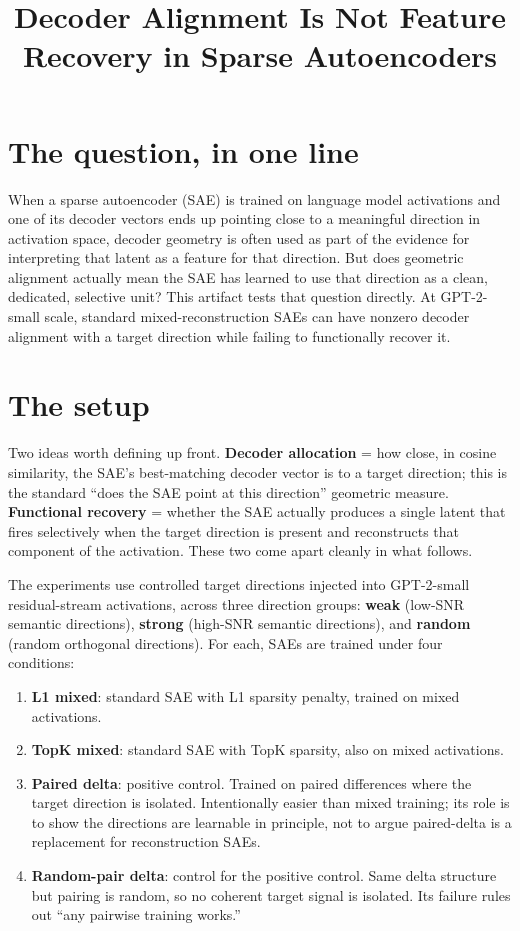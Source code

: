 \documentclass[10pt]{article}
\title{\vspace{-2.5em}\textbf{Decoder Alignment Is Not Feature Recovery in Sparse Autoencoders}\vspace{-0.5em}}
\author{}
\date{}
\begin{document}
\maketitle
\vspace{-3em}

\section*{The question, in one line}

When a sparse autoencoder (SAE) is trained on language model activations and one of its decoder vectors ends up pointing close to a meaningful direction in activation space, decoder geometry is often used as part of the evidence for interpreting that latent as a feature for that direction. But does geometric alignment actually mean the SAE has learned to use that direction as a clean, dedicated, selective unit? This artifact tests that question directly. At GPT-2-small scale, standard mixed-reconstruction SAEs can have nonzero decoder alignment with a target direction while failing to functionally recover it.

\section*{The setup}

Two ideas worth defining up front. \textbf{Decoder allocation} = how close, in cosine similarity, the SAE's best-matching decoder vector is to a target direction; this is the standard ``does the SAE point at this direction'' geometric measure. \textbf{Functional recovery} = whether the SAE actually produces a single latent that fires selectively when the target direction is present and reconstructs that component of the activation. These two come apart cleanly in what follows.

The experiments use controlled target directions injected into GPT-2-small residual-stream activations, across three direction groups: \textbf{weak} (low-SNR semantic directions), \textbf{strong} (high-SNR semantic directions), and \textbf{random} (random orthogonal directions). For each, SAEs are trained under four conditions:

\begin{enumerate}\setlength\itemsep{0em}\setlength{\parskip}{0pt}
  \item \textbf{L1 mixed}: standard SAE with L1 sparsity penalty, trained on mixed activations.
  \item \textbf{TopK mixed}: standard SAE with TopK sparsity, also on mixed activations.
  \item \textbf{Paired delta}: positive control. Trained on paired differences where the target direction is isolated. Intentionally easier than mixed training; its role is to show the directions are learnable in principle, not to argue paired-delta is a replacement for reconstruction SAEs.
  \item \textbf{Random-pair delta}: control for the positive control. Same delta structure but pairing is random, so no coherent target signal is isolated. Its failure rules out ``any pairwise training works.''
\end{enumerate}
\end{document}
